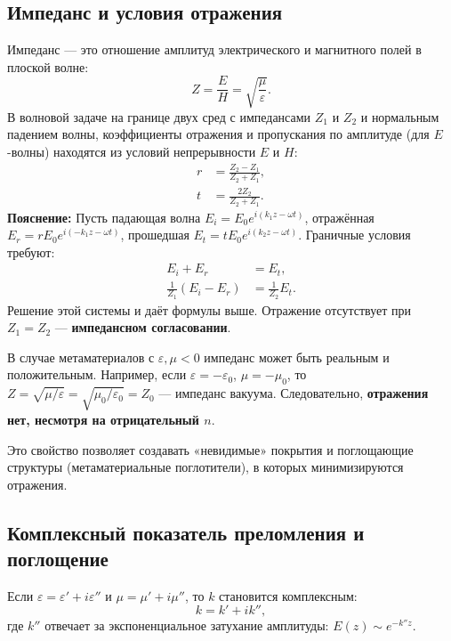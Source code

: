 \documentclass[a4paper,12pt]{article}
\begin{document}
\subsection{Импеданс и условия отражения}
Импеданс — это отношение амплитуд электрического и магнитного полей в плоской волне:
\begin{equation}
    Z = \frac{E}{H} = \sqrt{\frac{\mu}{\varepsilon}}.
\end{equation}
В волновой задаче на границе двух сред с импедансами $Z_1$ и $Z_2$ и нормальным падением волны, коэффициенты отражения и пропускания по амплитуде (для $E$-волны) находятся из условий непрерывности $E$ и $H$:
\begin{align}
    r &= \frac{Z_2 - Z_1}{Z_2 + Z_1}, \\
    t &= \frac{2Z_2}{Z_2 + Z_1}.
\end{align}
\textbf{Пояснение:} Пусть падающая волна $E_i = E_0 e^{i(k_1 z - \omega t)}$, отражённая $E_r = rE_0 e^{i(-k_1 z - \omega t)}$, прошедшая $E_t = tE_0 e^{i(k_2 z - \omega t)}$. Граничные условия требуют:
\begin{align*}
    E_i + E_r &= E_t, \\
    \frac{1}{Z_1}(E_i - E_r) &= \frac{1}{Z_2}E_t.
\end{align*}
Решение этой системы и даёт формулы выше. Отражение отсутствует при $Z_1 = Z_2$ — \textbf{импедансном согласовании}.

В случае метаматериалов с $\varepsilon, \mu < 0$ импеданс может быть реальным и положительным. Например, если $\varepsilon = -\varepsilon_0$, $\mu = -\mu_0$, то $Z = \sqrt{\mu/\varepsilon} = \sqrt{\mu_0/\varepsilon_0} = Z_0$ — импеданс вакуума. Следовательно, \textbf{отражения нет, несмотря на отрицательный $n$}.

Это свойство позволяет создавать «невидимые» покрытия и поглощающие структуры (метаматериальные поглотители), в которых минимизируются отражения.

\subsection{Комплексный показатель преломления и поглощение}
Если $\varepsilon = \varepsilon' + i\varepsilon''$ и $\mu = \mu' + i\mu''$, то $k$ становится комплексным:
\begin{equation}
    k = k' + i k'',
\end{equation}
где $k''$ отвечает за экспоненциальное затухание амплитуды: $E(z) \sim e^{-k'' z}$.
\end{document}
